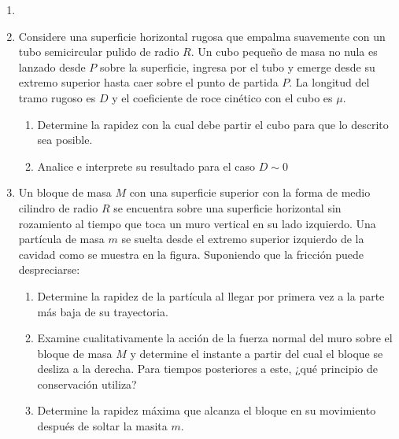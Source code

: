 \documentclass[letterpaper,11pt]{article}
\begin{document}
\vspace{-1cm}
\begin{enumerate}\setlength{\itemsep}{0.4cm}


\item[]

\item Considere una superficie horizontal rugosa que empalma suavemente con un tubo semicircular pulido de radio $R$. Un cubo pequeño de masa no nula es lanzado desde $P$ sobre la superficie, ingresa por el tubo y emerge desde su extremo superior hasta caer sobre el punto de partida $P$. La longitud del tramo rugoso es $D$ y el coeficiente de roce cinético con el cubo es $\mu$.
    \begin{enumerate}
        \item Determine la rapidez con la cual debe partir el cubo para que lo descrito sea posible.
        \item Analice e interprete su resultado para el caso $D \sim 0$
    \end{enumerate}

\item Un bloque de masa $M$ con una superficie superior con la forma de medio cilindro de radio ${R}$ se encuentra sobre una superficie horizontal sin rozamiento al tiempo que toca un muro vertical en su lado izquierdo. Una partícula de masa ${m}$ se suelta desde el extremo superior izquierdo de la cavidad como se muestra en la figura. Suponiendo que la fricción puede despreciarse:
    \begin{enumerate}
        \item Determine la rapidez de la partícula al llegar por primera vez a la parte más baja de su trayectoria.
        \item Examine cualitativamente la acción de la fuerza normal del muro sobre el bloque de masa ${M}$ y determine el instante a partir del cual el bloque se desliza a la derecha. Para tiempos posteriores a este, ¿qué principio de conservación utiliza? 
        \item Determine la rapidez máxima que alcanza el bloque en su movimiento después de soltar la masita ${m}$.
    \end{enumerate}


\end{enumerate}
\end{document}
